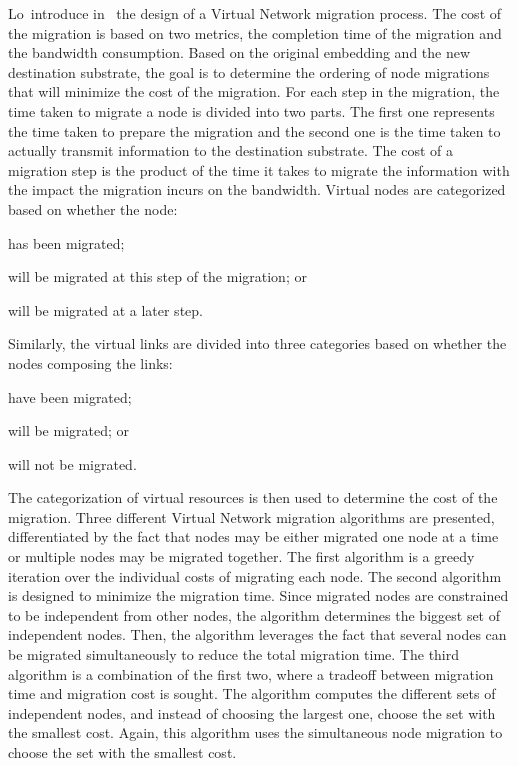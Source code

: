 Lo~\etal introduce in~\cite{vnm-lo2013} the design of a Virtual Network migration process.
The cost of the migration is based on two metrics, the completion time of the migration and the bandwidth consumption.
Based on the original embedding and the new destination substrate, the goal is to determine the ordering of node migrations that will minimize the cost of the migration.
For each step in the migration, the time taken to migrate a node is divided into two parts. The first one represents the time taken to prepare the migration and the second one is the time taken to actually transmit information to the destination substrate.
The cost of a migration step is the product of the time it takes to migrate the information with the impact the migration incurs on the bandwidth.
Virtual nodes are categorized based on whether the node:
\begin{inparaenum}[i)] 
\item has been migrated;
\item will be migrated at this step of the migration; or 
\item will be migrated at a later step.
\end{inparaenum}
Similarly, the virtual links are divided into three categories based on whether the nodes composing the links:
\begin{inparaenum}[i)]
\item have been migrated;
\item will be migrated; or 
\item will not be migrated.
\end{inparaenum}
The categorization of virtual resources is then used to determine the cost of the migration.
Three different Virtual Network migration algorithms are presented, differentiated by the fact that nodes may be either migrated one node at a time or multiple nodes may be migrated together.
The first algorithm is a greedy iteration over the individual costs of migrating each node.
The second algorithm is designed to minimize the migration time. Since migrated nodes are constrained to be independent from other nodes, the algorithm determines the biggest set of independent nodes.
Then, the algorithm leverages the fact that several nodes can be migrated simultaneously to reduce the total migration time.
The third algorithm is a combination of the first two, where a tradeoff between migration time and migration cost is sought. The algorithm computes the different sets of independent nodes, and instead of choosing the largest one, choose the set with the smallest cost.
Again, this algorithm uses the simultaneous node migration to choose the set with the smallest cost.


